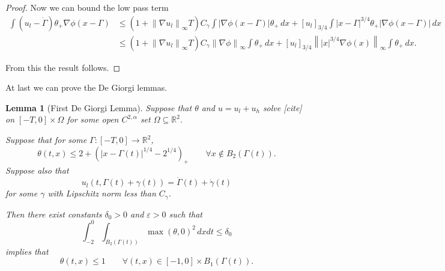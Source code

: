 \documentclass[11pt]{amsart}
\newtheorem{lemma}[theorem]{Lemma}
\theoremstyle{remark}
\theoremstyle{definition}
\newcommand{\R}{\mathbb{R}}
\newcommand{\eps}{\varepsilon}
\newcommand{\norm}[1]{\left\lVert#1\right\rVert}
\newcommand{\paren}[1]{\left( #1 \right)}
\newcommand{\bracket}[1]{\left[ #1 \right]}
\newcommand{\grad}{\nabla}
\newcommand{\ulow}{u_l}
\newcommand{\uhigh}{u_h}
\begin{document}
\begin{proof}
Now we can bound the low pass term
\begin{align*}
\int (\ulow - \dot{\Gamma}) \theta_+ \grad\phi(x-\Gamma) &\leq (1+\norm{\grad\ulow}_\infty T) C_\gamma \int |\grad\phi(x-\Gamma)| \theta_+ \,dx +  \bracket{\ulow}_{3/4} \int |x-\Gamma|^{3/4} \theta_+ |\grad \phi(x-\Gamma)| \,dx
\\ &\leq (1+\norm{\grad\ulow}_\infty T) C_\gamma \norm{\grad\phi}_\infty \int \theta_+ \,dx +  \bracket{\ulow}_{3/4} \norm{|x|^{3/4} \grad\phi(x)}_\infty \int \theta_+ \,dx.
\end{align*}

From this the result follows.  
\end{proof}

At last we can prove the De Giorgi lemmas.  

\begin{lemma}[First De Giorgi Lemma] \label{thm:DG1}
Suppose that $\theta$ and $u = \ulow + \uhigh$ solve [cite] on $[-T,0]\times \Omega$ for some open $C^{2,\alpha}$ set $\Omega \subseteq \R^2$.  

Suppose that for some $\Gamma:[-T,0]\to \R^2$, 
\[ \theta(t,x) \leq 2 + \paren{|x-\Gamma(t)|^{1/4}-2^{1/4}}_+ \qquad \forall x \notin B_2(\Gamma(t)). \]
Suppose also that
\[ \ulow(t,\Gamma(t)+\gamma(t)) = \dot{\Gamma}(t) + \dot{\gamma}(t) \]
for some $\gamma$ with Lipschitz norm less than $C_\gamma$.  

Then there exist constants $\delta_0>0$ and $\eps > 0$ such that
\[ \int_{-2}^0 \int_{B_2(\Gamma(t))} \max(\theta,0)^2 \,dxdt \leq \delta_0 \]
implies that
\[ \theta(t,x) \leq 1 \qquad \forall (t,x) \in [-1,0]\times B_1(\Gamma(t)). \]

\end{lemma}
\end{document}
